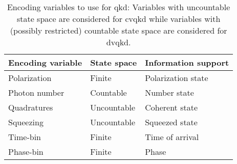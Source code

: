 \begin{table}[htb]
	\centering
	\begin{tabular}{lll}
		\toprule
		Encoding variable & State space & Information support \\
		\midrule
		Polarization & Finite & Polarization state \\
		Photon number & Countable & Number state \\
		Quadratures & Uncountable & Coherent state \\
		Squeezing & Uncountable & Squeezed state \\
		Time-bin & Finite & Time of arrival \\
		Phase-bin & Finite & Phase \\
		\bottomrule
	\end{tabular}
	\caption{Encoding variables to use for \gls{qkd}: Variables with uncountable state space are considered for \gls{cvqkd} while variables with (possibly restricted) countable state space are considered for \gls{dvqkd}.}
\end{table}